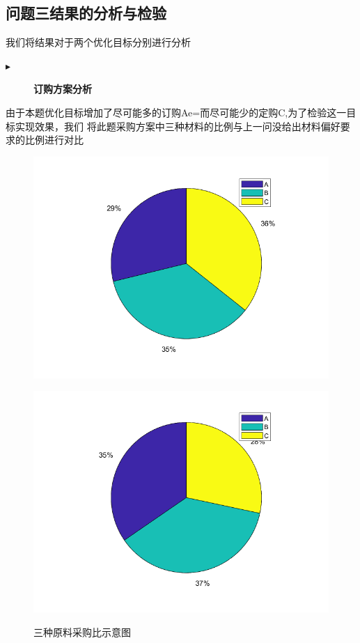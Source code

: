 \documentclass[withoutpreface,bwprint]{cumcmthesis}
\begin{document}
\subsection{问题三结果的分析与检验}
我们将结果对于两个优化目标分别进行分析
\begin{description}
    \item[$\blacktriangleright$] \textbf{订购方案分析}
\end{description} 
由于本题优化目标增加了尽可能多的订购Ae=而尽可能少的定购C,为了检验这一目标实现效果，我们
将此题采购方案中三种材料的比例与上一问没给出材料偏好要求的比例进行对比
\begin{figure}[H]
    \centering
    \begin{minipage}[c]{0.4\textwidth}
        \centering
        \includegraphics[width=1\textwidth]{before_edit.png}
        \label{fig:sample-figure-a}
    \end{minipage}
    \begin{minipage}[c]{0.4\textwidth}
        \centering
        \includegraphics[width=1\textwidth]{after_edit.png}
        \label{fig:sample-figure-b}
    \end{minipage}
    \caption{三种原料采购比示意图}
    \label{fig:sample-figure}
\end{figure}
\end{document}
